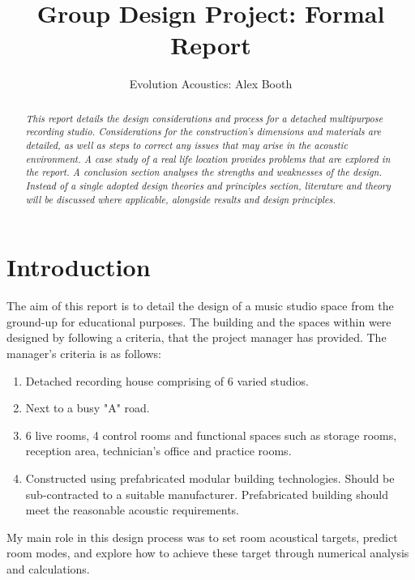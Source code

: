 \documentclass[10pt, twocolumn]{article}
\title{Group Design Project: Formal Report}
\author{Evolution Acoustics: Alex Booth}
\begin{document}
    \maketitle
    \begin{abstract}
        \it
        {
            This report details the design considerations and process for a detached multipurpose recording studio.
            Considerations for the construction's dimensions and materials are detailed, as well as steps to correct any issues that may arise in the acoustic environment.
            A case study of a real life location provides problems that are explored in the report.
            A conclusion section analyses the strengths and weaknesses of the design.
            Instead of a single adopted design theories and principles section, literature and theory will be discussed where applicable, alongside results and design principles.
        } 
    \end{abstract}
    \section{Introduction}
    The aim of this report is to detail the design of a music studio space from the ground-up for educational purposes.
    The building and the spaces within were designed by following a criteria, that the project manager has provided. 
    The manager's criteria is as follows:
    \begin{enumerate}
        \item Detached recording house comprising of 6 varied studios.
        \item Next to a busy "A" road.
        \item 6 live rooms, 4 control rooms and functional spaces such as storage rooms, reception area, technician's office and practice rooms.
        \item Constructed using prefabricated modular building technologies. Should be sub-contracted to a suitable manufacturer. Prefabricated building should meet the reasonable acoustic requirements.
    \end{enumerate}
    My main role in this design process was to set room acoustical targets, predict room modes, and explore how to achieve these target through numerical analysis and calculations.
\end{document}
